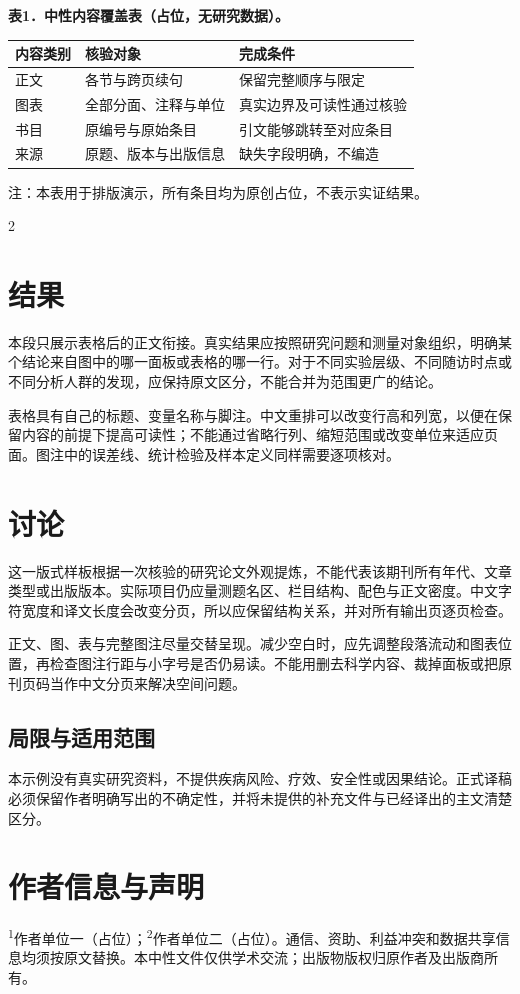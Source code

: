 \documentclass[UTF8,fontset=none,scheme=plain]{ctexart}
\begin{document}
\clearpage
\noindent\textbf{\textcolor{NEJMRed}{表1．}中性内容覆盖表（占位，无研究数据）。}\par\smallskip
{\fontsize{8bp}{10.4bp}\selectfont\renewcommand{\arraystretch}{1.12}\noindent\begin{tabularx}{\linewidth}{@{}lXX@{}}\toprule
内容类别 & 核验对象 & 完成条件\\\midrule
正文 & 各节与跨页续句 & 保留完整顺序与限定\\
图表 & 全部分面、注释与单位 & 真实边界及可读性通过核验\\
书目 & 原编号与原始条目 & 引文能够跳转至对应条目\\
来源 & 原题、版本与出版信息 & 缺失字段明确，不编造\\\bottomrule
\end{tabularx}\par}
{\fontsize{7.6bp}{9.2bp}\selectfont 注：本表用于排版演示，所有条目均为原创占位，不表示实证结果。\par}
\begin{multicols}{2}
\section*{结果}
本段只展示表格后的正文衔接。真实结果应按照研究问题和测量对象组织，明确某个结论来自图中的哪一面板或表格的哪一行。对于不同实验层级、不同随访时点或不同分析人群的发现，应保持原文区分，不能合并为范围更广的结论。

表格具有自己的标题、变量名称与脚注。中文重排可以改变行高和列宽，以便在保留内容的前提下提高可读性；不能通过省略行列、缩短范围或改变单位来适应页面。图注中的误差线、统计检验及样本定义同样需要逐项核对。
\section*{讨论}
这一版式样板根据一次核验的研究论文外观提炼，不能代表该期刊所有年代、文章类型或出版版本。实际项目仍应量测题名区、栏目结构、配色与正文密度。中文字符宽度和译文长度会改变分页，所以应保留结构关系，并对所有输出页逐页检查。

正文、图、表与完整图注尽量交替呈现。减少空白时，应先调整段落流动和图表位置，再检查图注行距与小字号是否仍易读。不能用删去科学内容、裁掉面板或把原刊页码当作中文分页来解决空间问题。
\subsection*{局限与适用范围}
本示例没有真实研究资料，不提供疾病风险、疗效、安全性或因果结论。正式译稿必须保留作者明确写出的不确定性，并将未提供的补充文件与已经译出的主文清楚区分。
\section*{作者信息与声明}
\textsuperscript{1}作者单位一（占位）；\textsuperscript{2}作者单位二（占位）。通信、资助、利益冲突和数据共享信息均须按原文替换。本中性文件仅供学术交流；出版物版权归原作者及出版商所有。
\SampleBibliography
\SampleSourceInfo
\end{multicols}
\end{document}
